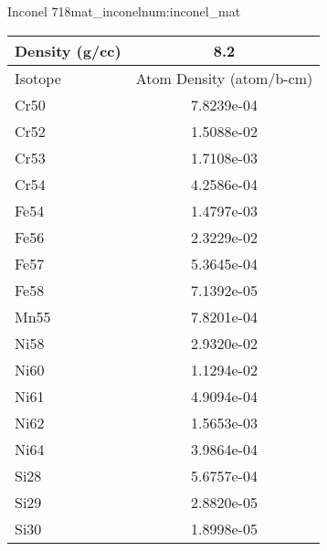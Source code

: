 \begin{matitem}{Inconel 718}{mat_inconel}{num:inconel_mat}
  \centering
  \begin{tabular}{l c}
    \toprule
    Density (g/cc) & 8.2 \\
    \midrule
    Isotope & Atom Density (atom/b-cm) \\
    \midrule
    \midrule
Cr50 & 7.8239e-04 \\
Cr52 & 1.5088e-02 \\
Cr53 & 1.7108e-03 \\
Cr54 & 4.2586e-04 \\
Fe54 & 1.4797e-03 \\
Fe56 & 2.3229e-02 \\
Fe57 & 5.3645e-04 \\
Fe58 & 7.1392e-05 \\
Mn55 & 7.8201e-04 \\
Ni58 & 2.9320e-02 \\
Ni60 & 1.1294e-02 \\
Ni61 & 4.9094e-04 \\
Ni62 & 1.5653e-03 \\
Ni64 & 3.9864e-04 \\
Si28 & 5.6757e-04 \\
Si29 & 2.8820e-05 \\
Si30 & 1.8998e-05 \\

    \bottomrule
  \end{tabular}
\end{matitem}

